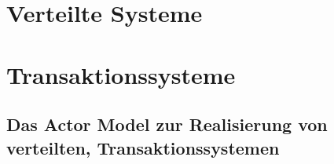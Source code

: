 
\chapter{Verteilte Systeme}
\chapter{Transaktionssysteme}
\section{Das Actor Model zur Realisierung von verteilten, Transaktionssystemen} 